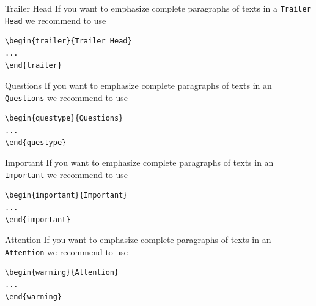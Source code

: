 \begin{trailer}{Trailer Head}
    If you want to emphasize complete paragraphs of texts in a \verb|Trailer Head| we recommend to
    use  \begin{verbatim}\begin{trailer}{Trailer Head}
...
\end{trailer}\end{verbatim}
\end{trailer}
%
\begin{questype}{Questions}
    If you want to emphasize complete paragraphs of texts in an \verb|Questions| we recommend to
    use  \begin{verbatim}\begin{questype}{Questions}
...
\end{questype}\end{verbatim}
\end{questype}
%
%
\begin{important}{Important}
    If you want to emphasize complete paragraphs of texts in an \verb|Important| we recommend to
    use  \begin{verbatim}\begin{important}{Important}
...
\end{important}\end{verbatim}
\end{important}
%
\clearpage
\begin{warning}{Attention}
    If you want to emphasize complete paragraphs of texts in an \verb|Attention| we recommend to
    use  \begin{verbatim}\begin{warning}{Attention}
...
\end{warning}\end{verbatim}
\end{warning}

